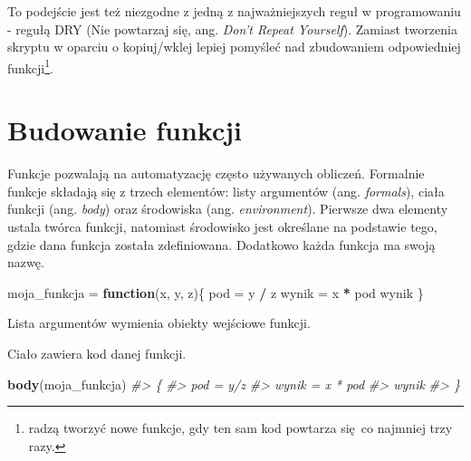 \documentclass[paper=6in:9in,pagesize=pdftex,headinclude=on,footinclude=on,10pt]{scrbook}
\newenvironment{Shaded}{\begin{snugshade}}{\end{snugshade}}
\newcommand{\CommentTok}[1]{\textcolor[rgb]{0.56,0.35,0.01}{\textit{#1}}}
\newcommand{\ControlFlowTok}[1]{\textcolor[rgb]{0.13,0.29,0.53}{\textbf{#1}}}
\newcommand{\KeywordTok}[1]{\textcolor[rgb]{0.13,0.29,0.53}{\textbf{#1}}}
\newcommand{\NormalTok}[1]{#1}
\newcommand{\OperatorTok}[1]{\textcolor[rgb]{0.81,0.36,0.00}{\textbf{#1}}}
\newcommand{\StringTok}[1]{\textcolor[rgb]{0.31,0.60,0.02}{#1}}
\begin{document}
To podejście jest też niezgodne z jedną z najważniejszych reguł w programowaniu - regułą DRY (Nie powtarzaj się, ang. \emph{Don't Repeat Yourself}).
Zamiast tworzenia skryptu w oparciu o kopiuj/wklej lepiej pomyśleć nad zbudowaniem odpowiedniej funkcji\footnote{\citet{wickham2016r} radzą tworzyć nowe funkcje, gdy ten sam kod powtarza się~co najmniej trzy razy.}.

\hypertarget{budowanie-funkcji}{%
\section{Budowanie funkcji}\label{budowanie-funkcji}}

Funkcje pozwalają na automatyzację często używanych obliczeń.
Formalnie funkcje składają się z trzech elementów: listy argumentów (ang. \emph{formals}), ciała funkcji (ang. \emph{body}) oraz środowiska (ang. \emph{environment}).
Pierwsze dwa elementy ustala twórca funkcji, natomiast środowisko jest określane na podstawie tego, gdzie dana funkcja została zdefiniowana.
Dodatkowo każda funkcja ma swoją nazwę.

\begin{Shaded}
\begin{Highlighting}[]
\NormalTok{moja_funkcja =}\StringTok{ }\ControlFlowTok{function}\NormalTok{(x, y, z)\{}
\NormalTok{  pod =}\StringTok{ }\NormalTok{y }\OperatorTok{/}\StringTok{ }\NormalTok{z}
\NormalTok{  wynik =}\StringTok{ }\NormalTok{x }\OperatorTok{*}\StringTok{ }\NormalTok{pod}
\NormalTok{  wynik}
\NormalTok{\}}
\end{Highlighting}
\end{Shaded}

Lista argumentów wymienia obiekty wejściowe funkcji.

\begin{Shaded}
\end{Shaded}

Ciało zawiera kod danej funkcji.

\begin{Shaded}
\begin{Highlighting}[]
\KeywordTok{body}\NormalTok{(moja_funkcja)}
\CommentTok{#> \{}
\CommentTok{#>     pod = y/z}
\CommentTok{#>     wynik = x * pod}
\CommentTok{#>     wynik}
\CommentTok{#> \}}
\end{Highlighting}
\end{Shaded}
\end{document}
